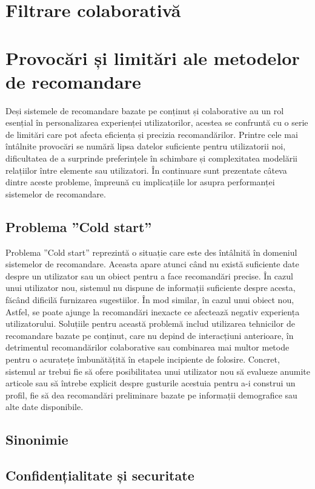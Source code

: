 \section{Filtrare colaborativă}
\label{sec:ch3sec2}
\section{Provocări și limitări ale metodelor de recomandare}
\label{sec:ch3sec3}
Deși sistemele de recomandare bazate pe conținut și colaborative au un rol esențial în personalizarea experienței utilizatorilor, acestea se confruntă cu o serie de limitări care pot afecta eficiența și precizia recomandărilor. 
Printre cele mai întâlnite provocări se numără lipsa datelor suficiente pentru utilizatorii noi, dificultatea de a surprinde preferințele în schimbare și complexitatea modelării relațiilor între elemente sau utilizatori. 
În continuare sunt prezentate câteva dintre aceste probleme, împreună cu implicațiile lor asupra performanței sistemelor de recomandare.

\subsection{Problema ”Cold start”}
\label{subsec:ch3sec3sub1}
Problema ”Cold start” reprezintă o situație care este des întâlnită în domeniul sistemelor de recomandare. 
Aceasta apare atunci când nu există suficiente date despre un utilizator sau un obiect pentru a face recomandări precise.
În cazul unui utilizator nou, sistemul nu dispune de informații suficiente despre acesta, făcând dificilă furnizarea sugestiilor.
În mod similar, în cazul unui obiect nou, 
Astfel, se poate ajunge la recomandări inexacte ce afectează negativ experiența utilizatorului.
Soluțiile pentru această problemă includ utilizarea tehnicilor de recomandare bazate pe conținut, care nu depind de interacțiuni anterioare, 
în detrimentul recomandărilor colaborative sau combinarea mai multor metode pentru o acuratețe îmbunătățită în etapele incipiente de folosire.
Concret, sistemul ar trebui fie să ofere posibilitatea unui utilizator nou să evalueze anumite articole sau să întrebe explicit despre gusturile acestuia pentru a-i construi un profil, 
fie să dea recomandări preliminare bazate pe informații demografice sau alte date disponibile\cite{kumar2018recommendation}.


\subsection{Sinonimie}
\label{subsec:ch3sec3sub2}

\subsection{Confidențialitate și securitate}
\label{subsec:ch3sec3sub3}